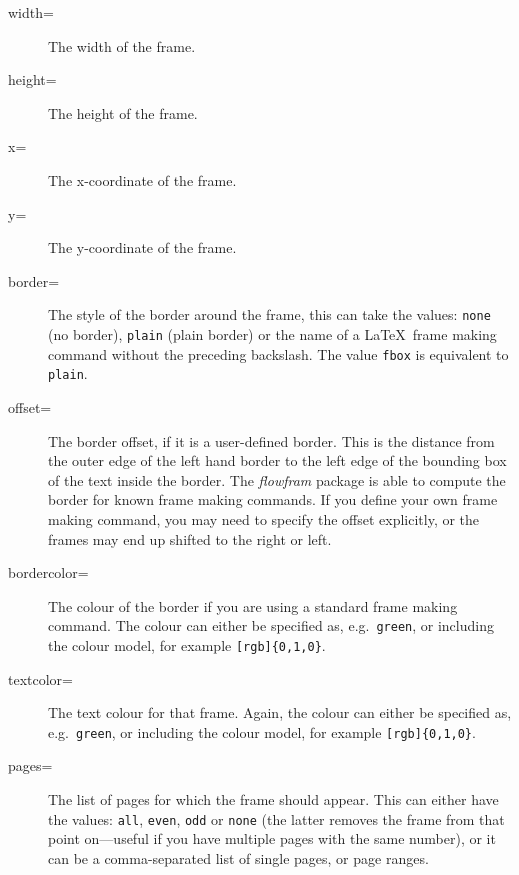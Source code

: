 \documentclass{article}
\begin{document}
\begin{description}
\item[width=]\mbox{}\par  The width of the frame.

\item[height=]\mbox{}\par The height of the frame.

\item[x=]\mbox{}\par The x-coordinate of the frame.

\item[y=]\mbox{}\par The y-coordinate of the frame.

\item[border=]\mbox{}\par The style of the border around the
frame, this can take the values: \texttt{none} (no border),
\texttt{plain} (plain border) or the name of a \LaTeX\
frame making command without the preceding backslash.
The value \texttt{fbox} is equivalent to \texttt{plain}.

\item[offset=]\mbox{}\par The border offset, if it is a
user-defined border.  This is the distance from the outer
edge of the left hand border to the left edge of the
bounding box of the text inside the border.  The \textsl{flowfram}
package is able to compute the border for
known frame making commands.
If you define your own frame making command, you may need to
specify the offset explicitly, or the frames
may end up shifted to the right or left.

\item[bordercolor=]\mbox{}\par The colour of the border
if you are using a standard frame making command.
The colour can either be specified as, e.g.\ \texttt{green},
or including the colour model, for example
\verb/[rgb]{0,1,0}/.

\item[textcolor=]\mbox{}\par The text colour for that
frame. Again, the colour can either be specified as,
e.g.\ \texttt{green}, or including the colour model,
for example \verb/[rgb]{0,1,0}/.

\item[pages=]\mbox{}\par The {list of
pages} for which the frame
should appear. This can either have the values: \texttt{all},
\texttt{even}, \texttt{odd} or \texttt{none} (the latter
removes the frame from that point on---useful if you
have multiple pages with the same number), or it can be a
comma-separated list of single pages, or
{page ranges}.


\end{description}
\end{document}

